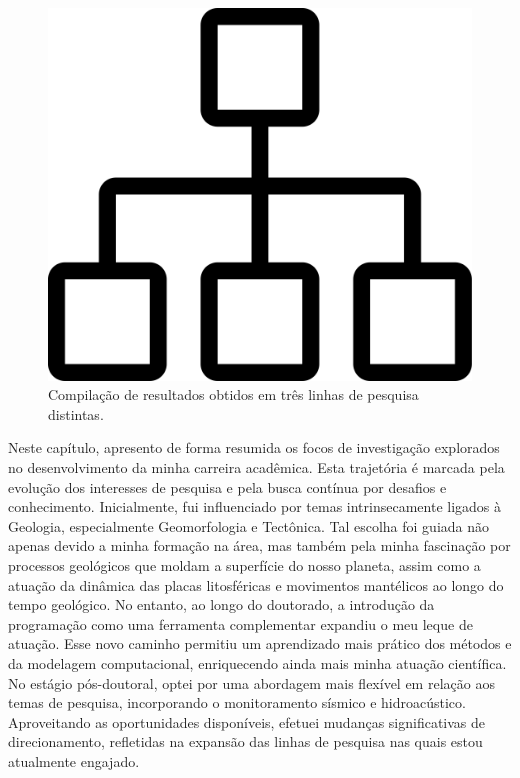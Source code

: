 \documentclass[10pt,a4paper,oneside]{book}
\newcommand{\HeroFigPad}{\vspace{-1cm}}
\begin{document}
\begin{figure}[h]
  \HeroFigPad
  \begin{center}
    \includegraphics[width=\textwidth]{images/inicio.png}
  \end{center}
  \caption{
    Compilação de resultados obtidos em três linhas de pesquisa distintas.
  }
\end{figure}

Neste capítulo, apresento de forma resumida os focos de investigação explorados no desenvolvimento da minha carreira acadêmica. Esta trajetória é marcada pela evolução dos interesses de pesquisa e pela busca contínua por desafios e conhecimento. Inicialmente, fui influenciado por temas intrinsecamente ligados à Geologia, especialmente Geomorfologia e Tectônica. Tal escolha foi guiada não apenas devido a minha formação na área, mas também pela minha fascinação por processos geológicos que moldam a superfície do nosso planeta, assim como a atuação da dinâmica das placas litosféricas e movimentos mantélicos ao longo do tempo geológico. No entanto, ao longo do doutorado, a introdução da programação como uma ferramenta complementar expandiu o meu leque de atuação. Esse novo caminho permitiu um aprendizado mais prático dos métodos e da modelagem computacional, enriquecendo ainda mais minha atuação científica. No estágio pós-doutoral, optei por uma abordagem mais flexível em relação aos temas de pesquisa, incorporando o monitoramento sísmico e hidroacústico. Aproveitando as oportunidades disponíveis, efetuei mudanças significativas de direcionamento, refletidas na expansão das linhas de pesquisa nas quais estou atualmente engajado. 
\end{document}
